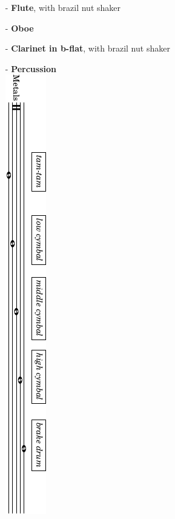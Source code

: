 \documentclass[10pt]{article}
\begin{document}
\begin{textblock}{23}
\begin{itemize}

    \item[-] \textbf{Flute}, with brazil nut shaker \\

    \item[-] \textbf{Oboe} \\

    \item[-] \textbf{Clarinet in b-flat}, with brazil nut shaker \\

    \item[-] \textbf{Percussion} \\

        \includegraphics{preface-percussion-metals.pdf} \\ \\ \\

\end{itemize}
\end{textblock}
\end{document}
